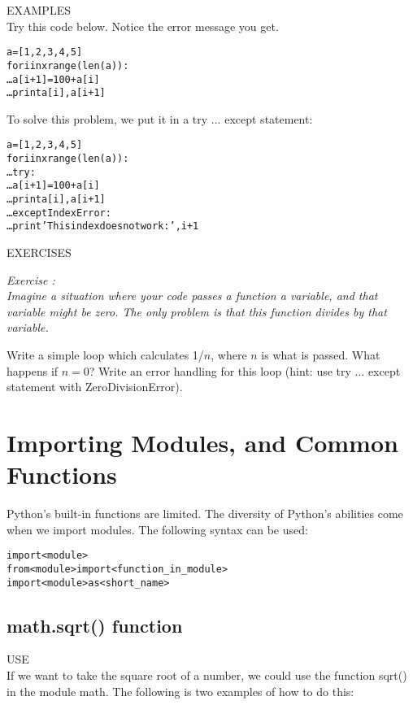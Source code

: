 {\color{blue} {\sf\small EXAMPLES}} \\
Try this code below.  Notice the error message you get.
\begin{alltt}
\pytab a = [1,2,3,4,5]  
\pytab for i in xrange(len(a)): 
\ldots    a[i+1] = 100 + a[i] 
\ldots    print a[i], a[i+1] 
\end{alltt}
To solve this problem, we put it in a {\sf\small try ... except}
statement: 
\begin{alltt}
\pytab a = [1,2,3,4,5] 
\pytab for i in xrange(len(a)): 
\ldots     try:  
\ldots         a[i+1] = 100 + a[i] 
\ldots         print a[i], a[i+1] 
\ldots     except IndexError: 
\ldots         print 'This index does not work: ',i+1
\end{alltt}

{\color{blue} {\sf\small EXERCISES}} \\
{\it Exercise  :  \\
  Imagine a situation where your code passes a function a variable,
  and that variable might be zero.  The only problem is that this
  function divides by that variable.
  
  Write a simple loop which calculates 1/$n$, where $n$ is what is
  passed.  What happens if $n=0$?  Write an error handling for this loop
  (hint: use {\sf\small try ... except} statement with
  ZeroDivisionError).}

\section{Importing Modules, and Common Functions}
\label{s:mod}
Python's built-in functions are limited.  The diversity of Python's
abilities come when we import modules.  The following syntax can be
used: 

\begin{alltt}
\pytab import <module>
\pytab from <module> import <function_in_module>
\pytab import <module> as <short_name>
\end{alltt}

\subsection{ {\sf math.sqrt() } function} 
{\color{blue} {\sf\small USE}} \\
If we want to take the square root of a number, we could
use the function {\sf\small sqrt()} in the module {\sf \small math}.  The following is two
examples of how to do this:
  
